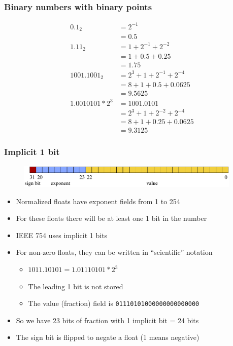 \documentclass{beamer}
\begin{document}
\begin{frame}
    \frametitle{Binary numbers with binary points}
\begin{align*}
    0.1_2   &= 2^{-1} \\
            &= 0.5 \\
    1.11_2  &= 1 + 2^{-1} + 2^{-2} \\
            &= 1 + 0.5 + 0.25 \\
            &= 1.75 \\
    1001.1001_2 &= 2^3 + 1 + 2^{-1} + 2^{-4} \\
              &= 8 + 1 + 0.5 + 0.0625 \\
              &= 9.5625 \\
    1.0010101 * 2^3 &= 1001.0101 \\
                  &= 2^3 + 1 + 2^{-2} + 2^{-4} \\
                    &= 8 + 1 + 0.25 + 0.0625 \\
                    &= 9.3125
\end{align*}
\end{frame}

\begin{frame}
    \frametitle{Implicit 1 bit}
\begin{figure}[h!]
\centering\includegraphics[width=0.95\textwidth]{float.pdf}
\end{figure}
    \begin{itemize}
        \item Normalized floats have exponent fields from 1 to 254
        \item For these floats there will be at least one 1 bit in the number
        \item IEEE 754 uses implicit 1 bits
        \item For non-zero floats, they can be written in ``scientific'' notation
        \begin{itemize}
            \item $1011.10101 = 1.01110101 * 2^3$
            \item The leading 1 bit is not stored
            \item The value (fraction) field is {\tt 01110101000000000000000}
        \end{itemize}
        \item So we have 23 bits of fraction with 1 implicit bit = 24 bits
        \item The sign bit is flipped to negate a float (1 means negative)
    \end{itemize}

\end{frame}
\end{document}
